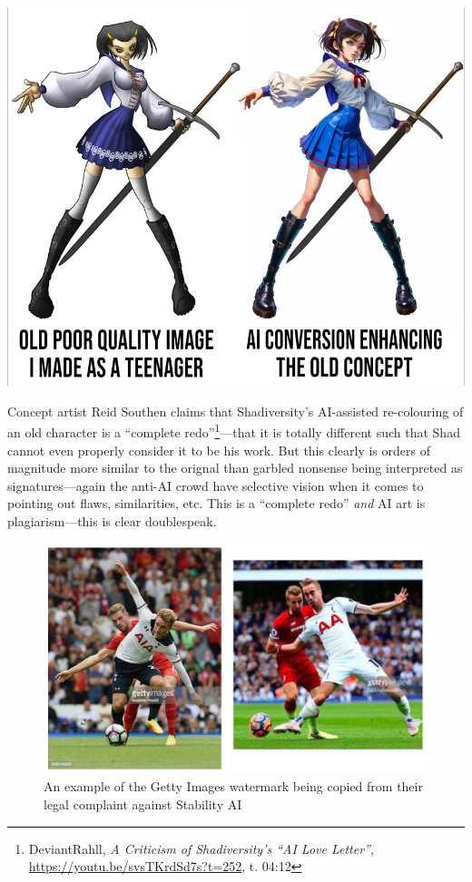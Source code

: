 \documentclass[11pt]{article}
\begin{document}
\begin{center}
\includegraphics[width=.9\linewidth]{./images/Shadiversity recolouring reid complete redo.png}
\end{center}

Concept artist Reid Southen claims that Shadiversity's AI-assisted re-colouring of an old character is a ``complete redo''\footnote{DeviantRahll, \emph{A Criticism of Shadiversity's ``AI Love Letter''}, \url{https://youtu.be/svsTKrdSd7s?t=252}, t. 04:12}---that it is totally different such that Shad cannot even properly consider it to be his work. But this clearly is orders of magnitude more similar to the orignal than garbled nonsense being interpreted as signatures---again the anti-AI crowd have selective vision when it comes to pointing out flaws, similarities, etc. This is a ``complete redo'' \emph{and} AI art is plagiarism---this is clear doublespeak.

\begin{figure}[htbp]
\centering
\includegraphics[width=.9\linewidth]{./images/getty images.png}
\caption{An example of the Getty Images watermark being copied from their legal complaint against Stability AI}
\end{figure}
\end{document}

